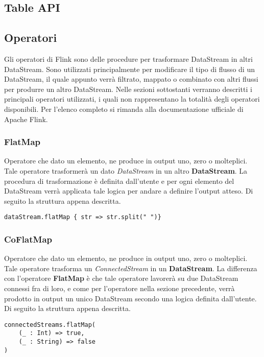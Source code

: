 \subsection{Table API}

\subsection{Operatori}\label{sec:operatori}
Gli operatori di Flink sono delle procedure per trasformare DataStream in altri DataStream. Sono utilizzati principalmente per modificare il tipo di flusso di un DataStream, il quale appunto verrà filtrato, mappato o combinato con altri flussi per produrre un altro DataStream. Nelle sezioni sottostanti verranno descritti i principali operatori utilizzati, i quali non rappresentano la totalità degli operatori disponibili. Per l'elenco completo si rimanda alla documentazione ufficiale di Apache Flink.

\subsubsection{FlatMap}
Operatore che dato un elemento, ne produce in output uno, zero o molteplici. Tale operatore trasformerà un dato \textit{DataStream} in un altro \textbf{DataStream}. La procedura di trasformazione è definita dall'utente e per ogni elemento del DataStream verrà applicata tale logica per andare a definire l'output atteso. Di seguito la struttura appena descritta.

\begin{verbatim}
dataStream.flatMap { str => str.split(" ")}
\end{verbatim}
	
	
\subsubsection{CoFlatMap}
Operatore che dato un elemento, ne produce in output uno, zero o molteplici. Tale operatore trasforma un \textit{ConnectedStream} in un \textbf{DataStream}. La differenza con l'operatore \textbf{FlatMap} è che tale operatore lavorerà su due DataStream connessi fra di loro, e come per l'operatore nella sezione precedente, verrà prodotto in output un unico DataStream secondo una logica definita dall'utente. Di seguito la struttura appena descritta.

\begin{verbatim}
connectedStreams.flatMap(
    (_ : Int) => true,
    (_ : String) => false
)
\end{verbatim}

